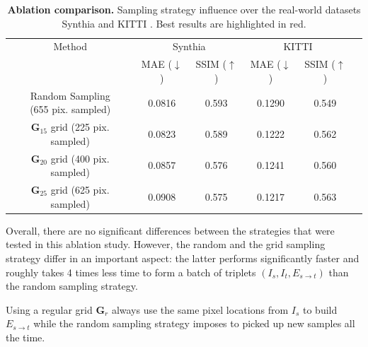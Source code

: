 \begin{table}[h!]
    \caption{\textbf{Ablation comparison.} Sampling strategy influence over the real-world datasets Synthia \citep{ros2016synthia} and KITTI \citep{geiger2012we}. Best results are highlighted in \colorbox{red!25}{red}. }
    \label{tab:3}
    \begin{center}%
    \begin{adjustbox}{width =.8\linewidth}
    \begin{tabular}[h]{c||ccccc}
    \hline
      Method & \multicolumn{2}{c}{Synthia} & \multicolumn{2}{c}{KITTI} \\
      &  MAE ($\downarrow$) & SSIM ($\uparrow$) & MAE ($\downarrow$) & SSIM ($\uparrow$) \\
    \hline
    \makecell{ Random Sampling \\ \footnotesize{(655 pix. sampled)}}& \cellcolor{red!25}0.0816 & \cellcolor{red!25}0.593 & 0.1290 & 0.549   \\ \hline
\makecell{$\textbf{G}_{15}$ grid \\ \footnotesize{(225 pix. sampled)}} & 0.0823 & 0.589 & 0.1222 & 0.562   \\ \hline
\makecell{$\textbf{G}_{20}$ grid \\ \footnotesize{(400 pix. sampled)}} & 0.0857 & 0.576 & 0.1241 & 0.560  \\ \hline
\makecell{$\textbf{G}_{25}$ grid \\ \footnotesize{(625 pix. sampled)}} & 0.0908 & 0.575 & \cellcolor{red!25}0.1217 & \cellcolor{red!25}0.563   \\ 
    \hline 
    \end{tabular}
    \end{adjustbox}
    \end{center}
    \end{table}


Overall, there are no significant differences between the strategies that were tested in this ablation study.  However, the random and the grid sampling strategy differ in an important aspect: the latter performs significantly faster and roughly takes 4 times less time to form a batch of triplets $\left(I_{s},I_{t},E_{s\xrightarrow{}t}\right)$ than the random sampling strategy. \newline

Using a regular grid $\textbf{G}_{r}$ always use the same pixel locations from $I_s$ to build  $E_{s\xrightarrow{}t}$ while the random sampling strategy imposes to picked up new samples all the time.  

